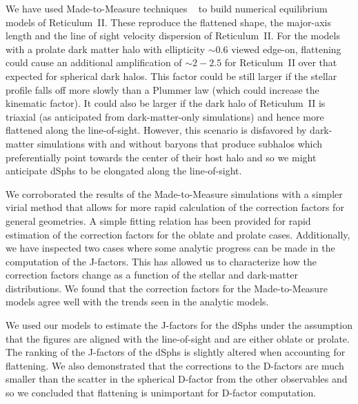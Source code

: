 \documentclass[prd,twocolumn,showpacs,preprintnumbers,superscriptaddress,nofootinbib,amsmath,amssymb,nobalancelastpage]{revtex4}
\begin{document}
We have used Made-to-Measure techniques ~\citep{Sy96,De09} to
build numerical equilibrium models of Reticulum~II. These reproduce the flattened
shape, the major-axis length and the line of sight velocity dispersion of Reticulum~II. For the models with a prolate dark matter halo with ellipticity $\sim
0.6$ viewed edge-on, flattening could cause an additional
amplification of $\sim 2-2.5$ for Reticulum~II over that expected
for spherical dark halos. This factor could be still larger if the
stellar profile falls off more slowly than a Plummer law (which could
increase the kinematic factor). It could also be larger if the dark halo of Reticulum~II is triaxial (as anticipated from dark-matter-only simulations) and hence more flattened along the line-of-sight. However, this scenario is disfavored by dark-matter simulations with and without baryons that produce subhalos which preferentially point towards the center of their host halo and so we might anticipate dSphs to be elongated along the line-of-sight.

We corroborated the results of the Made-to-Measure simulations with a simpler virial method that allows for more rapid calculation of the correction factors for general geometries. A simple fitting relation has been provided for rapid estimation of the correction factors for the oblate and prolate cases. Additionally, we have inspected two cases where some analytic progress can be made in the computation of the J-factors. This has allowed us to characterize how the correction factors change as a function of the stellar and dark-matter distributions. We found that the correction factors for the Made-to-Measure models agree well with the trends seen in the analytic models.

We used our models to estimate the J-factors for the dSphs under the assumption that the figures are aligned with the line-of-sight and are either oblate or prolate. The ranking of the J-factors of the dSphs is slightly altered when accounting for flattening. We also demonstrated that the corrections to the D-factors are much smaller than the scatter in the spherical D-factor from the other observables and so we concluded that flattening is unimportant for D-factor computation.
\end{document}
